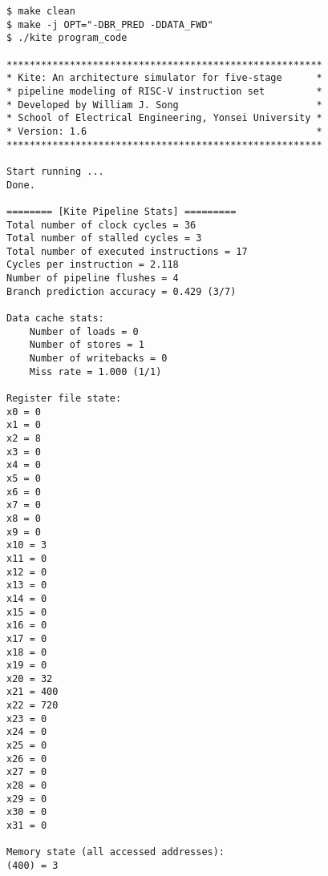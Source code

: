 \documentclass[10pt]{article}
\begin{document}
\begin{Verbatim}[frame=single,fontsize=\small]
$ make clean
$ make -j OPT="-DBR_PRED -DDATA_FWD"
$ ./kite program_code

*******************************************************
* Kite: An architecture simulator for five-stage      *
* pipeline modeling of RISC-V instruction set         *
* Developed by William J. Song                        *
* School of Electrical Engineering, Yonsei University *
* Version: 1.6                                        *
*******************************************************

Start running ...
Done.

======== [Kite Pipeline Stats] =========
Total number of clock cycles = 36
Total number of stalled cycles = 3
Total number of executed instructions = 17
Cycles per instruction = 2.118
Number of pipeline flushes = 4
Branch prediction accuracy = 0.429 (3/7)

Data cache stats:
    Number of loads = 0
    Number of stores = 1
    Number of writebacks = 0
    Miss rate = 1.000 (1/1)

Register file state:
x0 = 0
x1 = 0
x2 = 8
x3 = 0
x4 = 0
x5 = 0
x6 = 0
x7 = 0
x8 = 0
x9 = 0
x10 = 3
x11 = 0
x12 = 0
x13 = 0
x14 = 0
x15 = 0
x16 = 0
x17 = 0
x18 = 0
x19 = 0
x20 = 32
x21 = 400
x22 = 720
x23 = 0
x24 = 0
x25 = 0
x26 = 0
x27 = 0
x28 = 0
x29 = 0
x30 = 0
x31 = 0

Memory state (all accessed addresses):
(400) = 3
\end{Verbatim}
\end{document}
